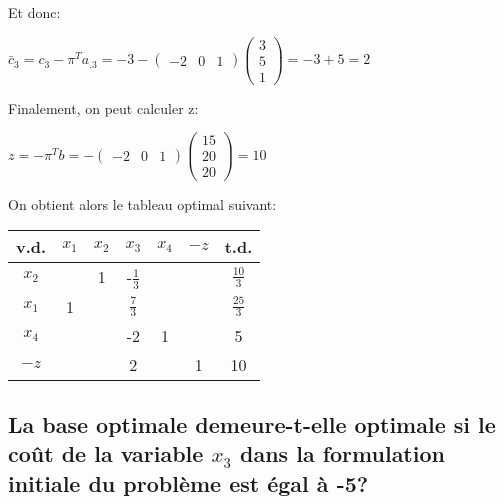 Et donc:

\begin{center}
	\begin{math}
	\bar{c}_3 = c_3 - \pi^Ta_{.3} = -3 - 
	\begin{pmatrix}
	-2 & 0 & 1
	\end{pmatrix}
	\begin{pmatrix}
		3 \\
		5 \\
		1
	\end{pmatrix}
	= -3 + 5 = 2
	\end{math}
\end{center}

Finalement, on peut calculer z:

\begin{center}
	\begin{math}
	z = -\pi^Tb = - 
	\begin{pmatrix}
	-2 & 0 & 1
	\end{pmatrix}
	\begin{pmatrix}
		15 \\
		20 \\
		20
	\end{pmatrix}
	= 10
	\end{math}
\end{center}
On obtient alors le tableau optimal suivant:

\begin{center}
	\renewcommand{\arraystretch}{1.5}
	\begin{tabular}{|c|ccccc|c|}
		\hline
		v.d.  & $x_1$ & $x_2$ &     $x_3$      & $x_4$ & $-z$ &      t.d.      \\ \hline
		$x_2$ &       &   1   & -$\frac{1}{3}$ &       &      & $\frac{10}{3}$ \\
		$x_1$ &   1   &       & $\frac{7}{3}$  &       &      & $\frac{25}{3}$ \\
		$x_4$ &       &       &       -2       &   1   &      &       5        \\ \hline
		$-z$  &       &       &       2        &       &  1   &       10       \\ \hline
	\end{tabular}
\end{center}
	
\subsection{La base optimale demeure-t-elle optimale si le coût de la variable $x_3$ dans la formulation initiale du problème est égal à -5?}
	
